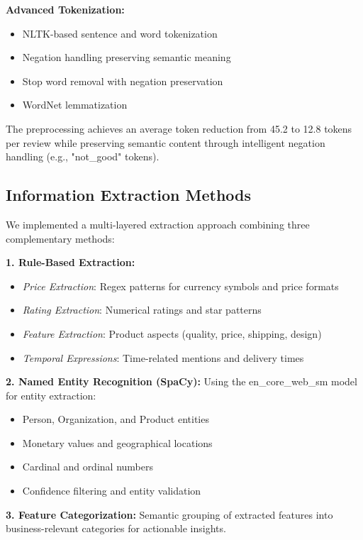 \documentclass[11pt,a4paper]{article}
\begin{document}
\textbf{Advanced Tokenization:}
\begin{itemize}[noitemsep]
    \item NLTK-based sentence and word tokenization
    \item Negation handling preserving semantic meaning
    \item Stop word removal with negation preservation
    \item WordNet lemmatization
\end{itemize}

The preprocessing achieves an average token reduction from 45.2 to 12.8 tokens per review while preserving semantic content through intelligent negation handling (e.g., "not\_good" tokens).

\subsection{Information Extraction Methods}

We implemented a multi-layered extraction approach combining three complementary methods:

\textbf{1. Rule-Based Extraction:}
\begin{itemize}[noitemsep]
    \item \textit{Price Extraction}: Regex patterns for currency symbols and price formats
    \item \textit{Rating Extraction}: Numerical ratings and star patterns
    \item \textit{Feature Extraction}: Product aspects (quality, price, shipping, design)
    \item \textit{Temporal Expressions}: Time-related mentions and delivery times
\end{itemize}

\textbf{2. Named Entity Recognition (SpaCy):}
Using the en\_core\_web\_sm model for entity extraction:
\begin{itemize}[noitemsep]
    \item Person, Organization, and Product entities
    \item Monetary values and geographical locations
    \item Cardinal and ordinal numbers
    \item Confidence filtering and entity validation
\end{itemize}

\textbf{3. Feature Categorization:}
Semantic grouping of extracted features into business-relevant categories for actionable insights.
\end{document}
